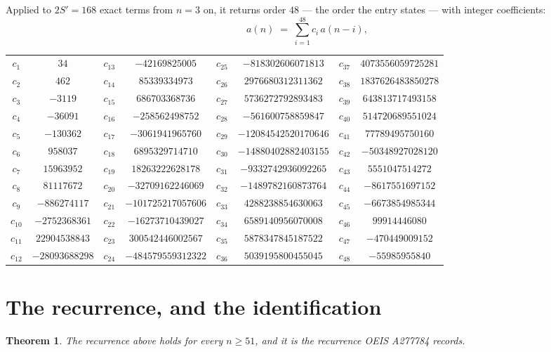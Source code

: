 \documentclass[11pt,a4paper]{article}
\theoremstyle{plain}
\newtheorem{theorem}{Theorem}
\theoremstyle{definition}
\begin{document}
Applied to $2S'=168$ exact terms from $n=3$ on, it returns order $48$ --- the
order the entry states --- with integer coefficients:
\[
a(n)\;=\;\sum_{i=1}^{48}c_i\,a(n-i),
\]
\begin{center}\small
\begin{tabular}{cccccccc}
$c_{1}$ & $34$ & $c_{13}$ & $-42169825005$ & $c_{25}$ & $-818302606071813$ & $c_{37}$ & $4073556059725281$ \\
$c_{2}$ & $462$ & $c_{14}$ & $85339334973$ & $c_{26}$ & $2976680312311362$ & $c_{38}$ & $1837626483850278$ \\
$c_{3}$ & $-3119$ & $c_{15}$ & $686703368736$ & $c_{27}$ & $5736272792893483$ & $c_{39}$ & $643813717493158$ \\
$c_{4}$ & $-36091$ & $c_{16}$ & $-258562498752$ & $c_{28}$ & $-561600758859847$ & $c_{40}$ & $514720689551024$ \\
$c_{5}$ & $-130362$ & $c_{17}$ & $-3061941965760$ & $c_{29}$ & $-12084542520170646$ & $c_{41}$ & $77789495750160$ \\
$c_{6}$ & $958037$ & $c_{18}$ & $6895329714710$ & $c_{30}$ & $-14880402882403155$ & $c_{42}$ & $-50348927028120$ \\
$c_{7}$ & $15963952$ & $c_{19}$ & $18263222628178$ & $c_{31}$ & $-9332742936092265$ & $c_{43}$ & $5551047514272$ \\
$c_{8}$ & $81117672$ & $c_{20}$ & $-32709162246069$ & $c_{32}$ & $-1489782160873764$ & $c_{44}$ & $-8617551697152$ \\
$c_{9}$ & $-886274117$ & $c_{21}$ & $-101725217057606$ & $c_{33}$ & $4288238854630063$ & $c_{45}$ & $-6673854985344$ \\
$c_{10}$ & $-2752368361$ & $c_{22}$ & $-16273710439027$ & $c_{34}$ & $6589140956070008$ & $c_{46}$ & $99914446080$ \\
$c_{11}$ & $22904538843$ & $c_{23}$ & $300542446002567$ & $c_{35}$ & $5878347845187522$ & $c_{47}$ & $-470449009152$ \\
$c_{12}$ & $-28093688298$ & $c_{24}$ & $-484579559312322$ & $c_{36}$ & $5039195800455045$ & $c_{48}$ & $-55985955840$ \\
\end{tabular}
\end{center}

\section{The recurrence, and the identification}

\begin{theorem}
The recurrence above holds for every $n\ge51$, and it is the recurrence OEIS A277784 records.
\end{theorem}
\end{document}
